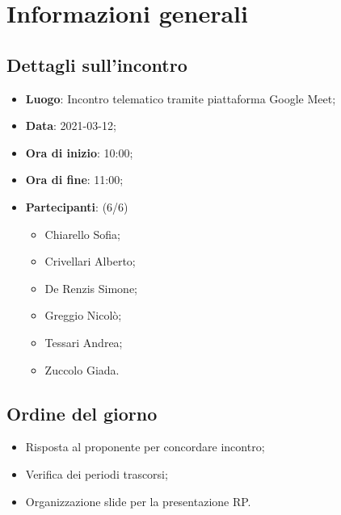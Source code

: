 \section{Informazioni generali}

\subsection{Dettagli sull'incontro}
\begin{itemize}
\item \textbf{Luogo}: Incontro telematico tramite piattaforma Google Meet;
\item \textbf{Data}: 2021-03-12;
\item \textbf{Ora di inizio}: 10:00;
\item \textbf{Ora di fine}: 11:00;
\item \textbf{Partecipanti}: (6/6) 
\begin{itemize}
	\item Chiarello Sofia;
	\item Crivellari Alberto;
	\item De Renzis Simone;
	\item Greggio Nicolò;
	\item Tessari Andrea;
	\item Zuccolo Giada.
\end{itemize}
\end{itemize}

\subsection{Ordine del giorno}
\begin{itemize}
	\item Risposta al proponente per concordare incontro;
	\item Verifica dei periodi trascorsi;
	\item Organizzazione slide per la presentazione RP.

\end{itemize}


